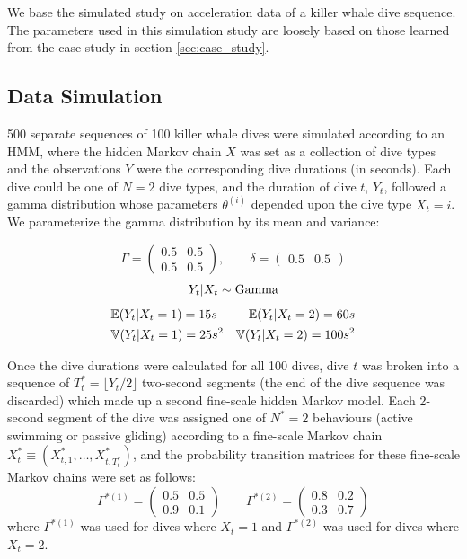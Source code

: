

We base the simulated study on acceleration data of a killer whale dive sequence. The parameters used in this simulation study are loosely based on those learned from the case study in section \ref{sec:case_study}.

\subsection{Data Simulation}

500 separate sequences of 100 killer whale dives were simulated according to an HMM, where the hidden Markov chain $X$ was set as a collection of dive types and the observations $Y$ were the corresponding dive durations (in seconds). Each dive could be one of $N=2$ dive types, and the duration of dive $t$, $Y_t$, followed a gamma distribution whose parameters $\theta^{(i)}$ depended upon the dive type $X_t = i$. We parameterize the gamma distribution by its mean and variance:

$$\Gamma = \begin{pmatrix} 0.5 & 0.5 \\ 0.5 & 0.5 \end{pmatrix}, \qquad \delta =  \begin{pmatrix} 0.5 & 0.5 \end{pmatrix}$$
$$Y_t|X_t \sim \rm{Gamma} $$
\begin{align*}
	&\mathbb{E}(Y_t|X_t = 1) = 15 s &\mathbb{E}(Y_t|X_t = 2) = 60 s \\
	&\mathbb{V}(Y_t|X_t = 1) = 25 s^2 &\mathbb{V}(Y_t|X_t = 2) = 100 s^2
\end{align*}

Once the dive durations were calculated for all 100 dives, dive $t$ was broken into a sequence of $T^*_t = \lfloor Y_t/2 \rfloor$ two-second segments (the end of the dive sequence was discarded) which made up a second fine-scale hidden Markov model. Each 2-second segment of the dive was assigned one of $N^*=2$ behaviours (active swimming or passive gliding) according to a fine-scale Markov chain $X^*_t \equiv \left(X^*_{t,1}, \ldots, X^*_{t,T^*_t} \right)$, and the probability transition matrices for these fine-scale Markov chains were set as follows:
%
$$\Gamma^{*(1)} = \begin{pmatrix} 0.5 & 0.5 \\ 0.9 & 0.1 \end{pmatrix} \qquad \Gamma^{*(2)} = \begin{pmatrix} 0.8 & 0.2 \\ 0.3 & 0.7 \end{pmatrix}$$
%
where $\Gamma^{*(1)}$ was used for dives where $X_t = 1$ and $\Gamma^{*(2)}$ was used for dives where $X_t = 2$. 

